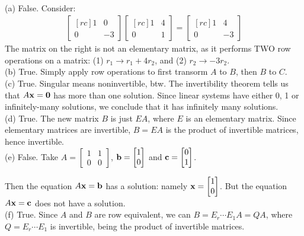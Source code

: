 \begin{solution}
\ \\
(a)
False. Consider:
\begin{eqnarray*}
\begin{bmatrix}[rc]
1&0\\
0&-3
\end{bmatrix}
\begin{bmatrix}[rc]
1&4\\
0&1
\end{bmatrix}
=
\begin{bmatrix}[rc]
1&4\\
0&-3
\end{bmatrix}
\end{eqnarray*}
The matrix on the right is not an elementary matrix, as it performs TWO row operations on a matrix: (1) $r_1\rightarrow r_1+4r_2$, and (2) $r_2\rightarrow -3r_2$. 
\\
(b) True. Simply apply row operations to first transorm $A$ to $B$, then $B$ to $C$. 
\\
(c) True. Singular means noninvertible, btw. The invertibility theorem tells us that $A{\mathbf x}={\mathbf 0}$ has more than one solution. Since linear systems have either 0, 1 or infinitely-many solutions, we conclude that it has infinitely many solutions. 
\\
(d) True. The new matrix $B$ is just $EA$, where $E$ is an elementary matrix. Since elementary matrices are invertible, $B=EA$ is the product of invertible matrices, hence invertible. 
\\
(e) False. Take $A=\begin{bmatrix}1&1\\0&0 \end{bmatrix}$, ${\mathbf b}=\begin{bmatrix}1\\0\end{bmatrix}$ and ${\mathbf c}=\begin{bmatrix}0\\1 \end{bmatrix}$. 

Then the equation $A{\mathbf x}={\mathbf b}$ has a solution: namely ${\mathbf x}=\begin{bmatrix}1\\0\end{bmatrix}$. But the equation $A{\mathbf x}={\mathbf c}$ does not have a solution. 
\\
(f)
True. 
Since $A$ and $B$ are row equivalent, we can $B = E_r \cdots E_1A=QA$, where $Q=E_r \cdots E_1$ is invertible, being the product of invertible matrices.  


\end{solution}
